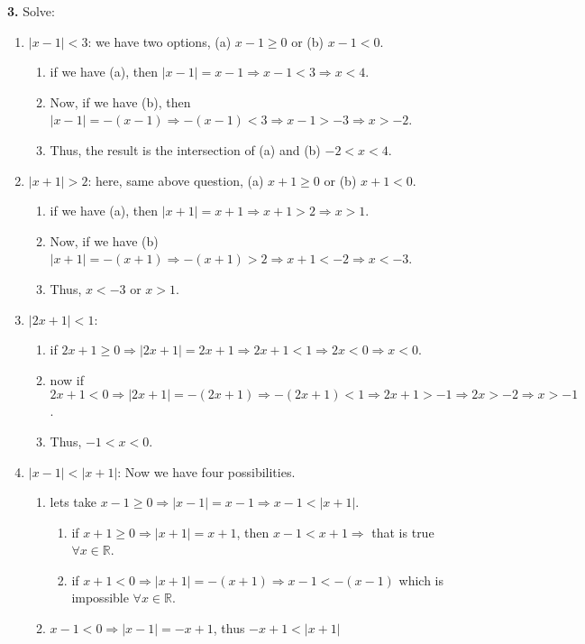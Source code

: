 \documentclass{amsart}
\begin{document}
\textbf{3.} Solve:
\begin{enumerate}
    \item $|x-1|<3$: we have two options, (a) $x-1\geq 0$ or (b) $x-1<0$.
    \begin{enumerate}
        \item if we have (a), then $|x-1|=x-1\Rightarrow x-1<3\Rightarrow x<4$.
        \item Now, if we have (b), then $|x-1|=-(x-1) \Rightarrow -(x-1)<3\Rightarrow x-1>-3\Rightarrow x>-2$.
        \item Thus, the result is the intersection of (a) and (b) $-2<x<4$.
    \end{enumerate}  
    \item $|x+1|>2$: here, same above question, (a) $x+1\geq 0$ or (b) $x+1<0$.
    \begin{enumerate}
        \item if we have (a), then $|x+1|=x+1\Rightarrow x+1>2 \Rightarrow x>1$.
        \item Now, if we have (b) $|x+1|=-(x+1)\Rightarrow -(x+1)>2\Rightarrow x+1<-2\Rightarrow x<-3$.
        \item Thus, $x<-3$ or $x>1$.
    \end{enumerate}
    \item $|2x+1|<1$: 
    \begin{enumerate}
        \item if $2x+1\geq 0\Rightarrow |2x+1|=2x+1\Rightarrow 2x+1<1\Rightarrow 2x<0\Rightarrow x<0$.
        \item now if $2x+1<0\Rightarrow |2x+1|=-(2x+1)\Rightarrow -(2x+1)<1\Rightarrow 2x+1>-1\Rightarrow 2x>-2\Rightarrow x>-1$.
        \item Thus, $-1<x<0$.
    \end{enumerate}
    \item $|x-1|<|x+1|$: Now we have four possibilities.
    \begin{enumerate}
        \item lets take $x-1\geq 0\Rightarrow |x-1|=x-1\Rightarrow x-1<|x+1|$.
        \begin{enumerate}
            \item if $x+1\geq0\Rightarrow |x+1|=x+1$, then $x-1<x+1\Rightarrow$ that is true $\forall x\in\mathbb{R}$.
            \item if $x+1<0\Rightarrow|x+1|=-(x+1)\Rightarrow x-1<-(x-1)$ which is impossible $\forall x \in \mathbb{R}$.
        \end{enumerate}
        \item $x-1<0\Rightarrow|x-1|=-x+1$, thus $-x+1<|x+1|$

\end{enumerate}
\end{enumerate}
\end{document}

